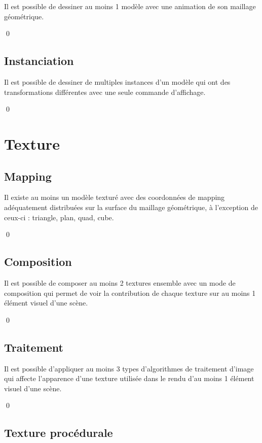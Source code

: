 \documentclass[12pt]{article}
\newcommand{\state}{\noindent}
\begin{document}
\state
Il est possible de dessiner au moins 1 modèle avec une animation de son maillage géométrique.

\qed

\subsection{Instanciation}

\state
Il est possible de dessiner de multiples instances d'un modèle qui ont des transformations différentes avec une seule commande d'affichage.

\qed

\pagebreak

\section{Texture}

\subsection{Mapping}

\state
Il existe au moins un modèle texturé avec des coordonnées de mapping adéquatement distribuées sur la surface du maillage géométrique, à l'exception de ceux-ci : triangle, plan, quad, cube.

\qed

\subsection{Composition}

\state
Il est possible de composer au moins 2 textures ensemble avec un mode de composition qui permet de voir la contribution de chaque texture sur au moins 1 élément visuel d'une scène.

\qed

\subsection{Traitement}

\state
Il est possible d'appliquer au moins 3 types d'algorithmes de traitement d'image qui affecte l'apparence d'une texture utilisée dans le rendu d'au moins 1 élément visuel d'une scène.

\qed

\subsection{Texture procédurale}
\end{document}
